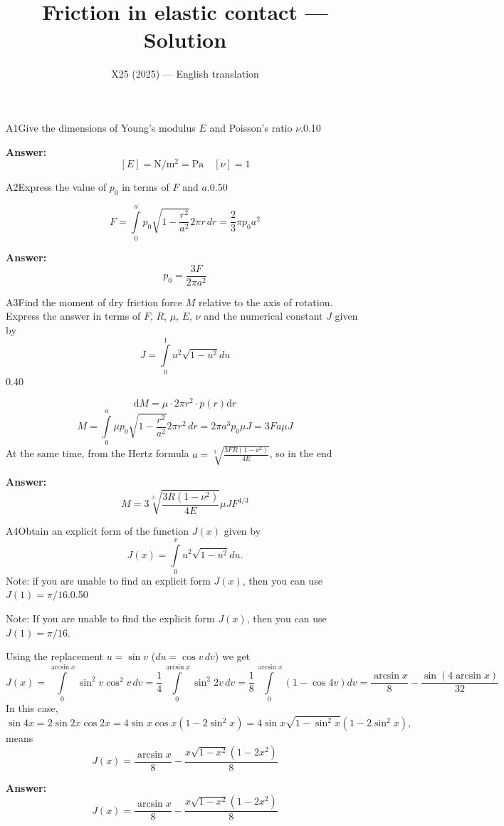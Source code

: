 \documentclass[11pt,a4paper]{article}
\title{\textbf{Friction in elastic contact --- Solution}}
\author{\normalsize X25 (2025) — English translation}
\date{}
\begin{document}
\maketitle\vspace{-0.5em}
\begin{solcard}{A1}{Give the dimensions of Young's modulus $E$ and Poisson's ratio $\nu$.}{0.10}
\par\smallskip\noindent\textbf{Answer:} \[ [E] = \mathrm{N} / \mathrm{m}^2 = \mathrm{Pa} \quad [\nu] = 1\]
\end{solcard}

\begin{solcard}{A2}{Express the value of $p_0$ in terms of $F$ and $a$.}{0.50}

\[F = \int\limits_0^a p_0 \sqrt{1 - \frac{r^2}{a^2}} 2 \pi r \, dr = \frac{2}{3} \pi p_0 a^2\]

\par\smallskip\noindent\textbf{Answer:} \[p_0 = \frac{3F}{2\pi a^2}\]
\end{solcard}

\begin{solcard}{A3}{Find the moment of dry friction force $M$ relative to the axis of rotation. Express the answer in terms of $F$, $R$, $\mu$, $E$, $\nu$ and the numerical constant $J$ given by \[J=\int\limits_0^1 u^2 \sqrt{1-u^2} du\]}{0.40}

\[\mathrm{d}M =\mu\cdot 2\pi  r^2\cdot p(r)\mathrm{d}r \]\[M = \int\limits_0^a \mu p_0 \sqrt{1-\frac{r^2}{a^2}} 2\pi r^2 \, dr = 2\pi a^3 p_0 \mu J = 3 F a \mu J \]At the same time, from the Hertz formula $a = \sqrt[3]{\frac{3FR(1-\nu^2)}{4E}}$, so in the end

\par\smallskip\noindent\textbf{Answer:} \[M = 3 \sqrt[3]{\frac{3R(1-\nu^2)}{4E}} \mu J F^{4/3} \]
\end{solcard}

\begin{solcard}{A4}{Obtain an explicit form of the function $J(x)$ given by \[J(x) = \int\limits_0^x u^2 \sqrt{1-u^2} du.\] Note: if you are unable to find an explicit form $J(x)$, then you can use $J(1)=\pi/16$.}{0.50}

Note: If you are unable to find the explicit form $J(x)$, then you can use $J(1)=\pi/16$.


Using the replacement $u= \sin v$ ($du =  \cos v \, dv$) we get \[J(x) = \int\limits_0^{\arcsin x} \sin^2 v \cos^2 v \, dv = \frac{1}{4} \int\limits_0^{\arcsin x} \sin^2 2v \, dv = \frac{1}{8} \int\limits_0^{\arcsin x} \left( 1 - \cos 4 v \right) dv = \frac{\arcsin x}{8} - \frac{\sin ( 4 \arcsin x )}{32} \]In this case, \[\sin 4x = 2 \sin 2x \cos 2x = 4 \sin x \cos x (1-2 \sin^2 x) = 4 \sin x \sqrt{1-\sin^2 x} (1- 2 \sin^2 x),\] means \[J(x) = \frac{\arcsin x}{8} -\frac{x\sqrt{1-x^2}(1-2x^2)}{8}\]

\par\smallskip\noindent\textbf{Answer:} \[ J(x) =\frac{\arcsin x}{8} -\frac{x\sqrt{1-x^2}(1-2x^2)}{8}\]
\end{solcard}
\end{document}
